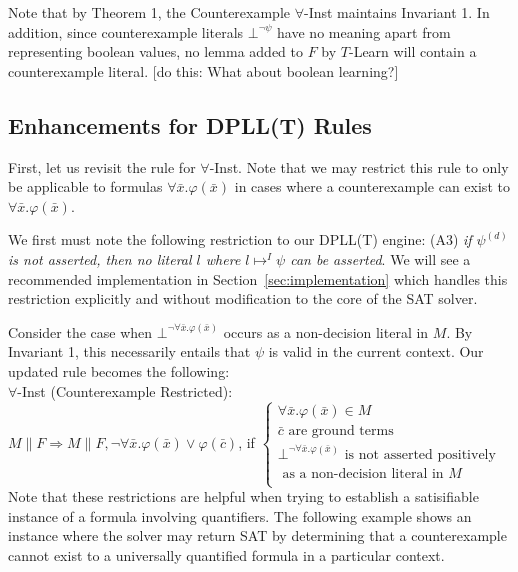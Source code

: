 \documentclass{llncs}
\begin{document}
Note that by Theorem 1, the Counterexample $\forall$-Inst maintains Invariant 1.
In addition, since counterexample literals $\bot^{ \neg \psi }$ have no meaning apart from representing boolean values, no lemma added to $F$ by $T$-Learn will contain a counterexample literal.
[do this: What about boolean learning?]

\subsection{Enhancements for DPLL(T) Rules}

First, let us revisit the rule for $\forall$-Inst.
Note that we may restrict this rule to only be applicable to formulas $\forall \bar{x}. \varphi( \bar{ x } )$ in cases where a counterexample can exist to $\forall \bar{x}. \varphi( \bar{ x } )$.

We first must note the following restriction to our DPLL(T) engine: (A3) \emph{if $\psi^{(d)}$ is not asserted, then no literal $l$ where $l \mapsto^I \psi$ can be asserted}.
We will see a recommended implementation in Section~\ref{sec:implementation} which handles this restriction explicitly and without modification to the core of the SAT solver.

Consider the case when $\bot^{\neg \forall \bar{x}. \varphi( \bar{ x } )}$ occurs as a non-decision literal in $M$.
By Invariant 1, this necessarily entails that $\psi$ is valid in the current context.
Our updated rule becomes the following: \\

\noindent $\forall$-Inst (Counterexample Restricted): \\

$M \parallel F \Longrightarrow M \parallel F, \neg \forall \bar{x}. \varphi( \bar{ x } ) \vee \varphi( \bar{ c } )$, if   
$\begin{cases}
  \forall \bar{x}. \varphi( \bar{ x } ) \in M \\
  \bar{ c } \text{ are ground terms} \\
  \bot^{\neg \forall \bar{x}. \varphi( \bar{ x } )} \text{ is not asserted positively }\\
  \text{ \ \ \ as a non-decision literal in $M$ } \\    
\end{cases}$ \\

Note that these restrictions are helpful when trying to establish a satisifiable instance of a formula involving quantifiers.
The following example shows an instance where the solver may return SAT by determining that a counterexample cannot exist to a universally quantified formula in a particular context.
\end{document}
